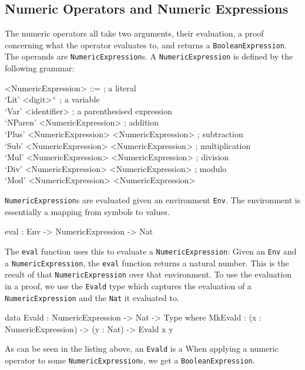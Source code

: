     \subsection{Numeric Operators and Numeric Expressions}
        The numeric operators all take two arguments, their evaluation, a proof concerning what the operator evaluates to, and returns a \texttt{BooleanExpression}.
        The operands are \texttt{NumericExpression}s. A \texttt{NumericExpression} is defined by the following grammar:
        \setlength{\grammarindent}{12em}
        \begin{grammar}
            <NumericExpression>
            ::=  ; a literal\\
                 `Lit' <digit>$^+$
            \alt ; a variable\\
                 `Var' <identifier>
            \alt ; a parenthesised expression\\
                 `NParen' <NumericExpression>
            \alt ; addition\\
                 `Plus' <NumericExpression> <NumericExpression>
            \alt ; subtraction\\
                 `Sub' <NumericExpression> <NumericExpression>
            \alt ; multiplication\\
                 `Mul' <NumericExpression> <NumericExpression>
            \alt ; division\\
                 `Div' <NumericExpression> <NumericExpression>
            \alt ; modulo\\
                 `Mod' <NumericExpression> <NumericExpression>
        \end{grammar}
        \texttt{NumericExpression}s are evaluated given an environment \texttt{Env}. The environment is essentially a mapping from symbols to values.
        \begin{code}[caption={The type of the \texttt{eval} function}]
            eval : Env -> NumericExpression -> Nat
        \end{code}
        The \texttt{eval} function uses this to evaluate a \texttt{NumericExpression}: Given an \texttt{Env} and a \texttt{NumericExpression}, the \texttt{eval} function returns a natural number. This is the result of that \texttt{NumericExpression} over that environment. To use the evaluation in a proof, we use the \texttt{Evald} type which captures the evaluation of a \texttt{NumericExpression} and the \texttt{Nat} it evaluated to.
        \begin{code}[caption={\texttt{Evald} as defined in the \textsc{TeamPlay} CSL}]
    data Evald : NumericExpression -> Nat -> Type where
        MkEvald : (x : NumericExpression) -> (y : Nat) -> Evald x y
        \end{code}
        As can be seen in the listing above, an \texttt{Evald} is a 
        When applying a numeric operator to some \texttt{NumericExpression}s, we get a \texttt{BooleanExpression}.
    
